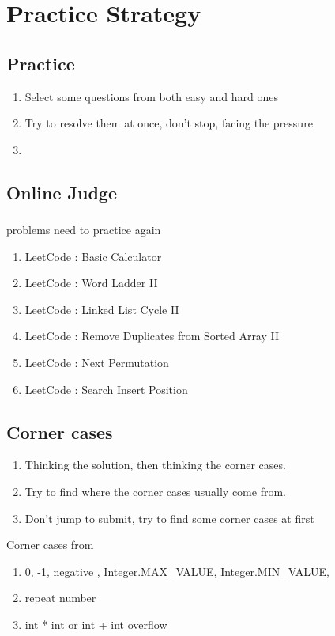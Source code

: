 \chapter{Practice Strategy}

\section{Practice }
\begin{enumerate}
    \item Select some questions from both easy and hard ones
    \item Try to resolve them at once, don't stop, facing the pressure
    \item
\end{enumerate}

\section{Online Judge }

\subsection{}

problems need to practice again

\begin{enumerate}
    \item LeetCode : Basic Calculator
    \item LeetCode : Word Ladder II
    \item LeetCode : Linked List Cycle II
    \item LeetCode : Remove Duplicates from Sorted Array II
    \item LeetCode : Next Permutation
    \item LeetCode : Search Insert Position
\end{enumerate}



\section{Corner cases     }

\begin{enumerate}
    \item Thinking the solution, then thinking the corner cases.
    \item Try to find where the corner cases usually come from.
    \item Don't jump to submit, try to find some corner cases at first
\end{enumerate}

Corner cases from

\begin{enumerate}
    \item  0, -1, negative , Integer.MAX\_VALUE, Integer.MIN\_VALUE,
    \item  repeat number
    \item  int * int or int + int overflow
\end{enumerate}


